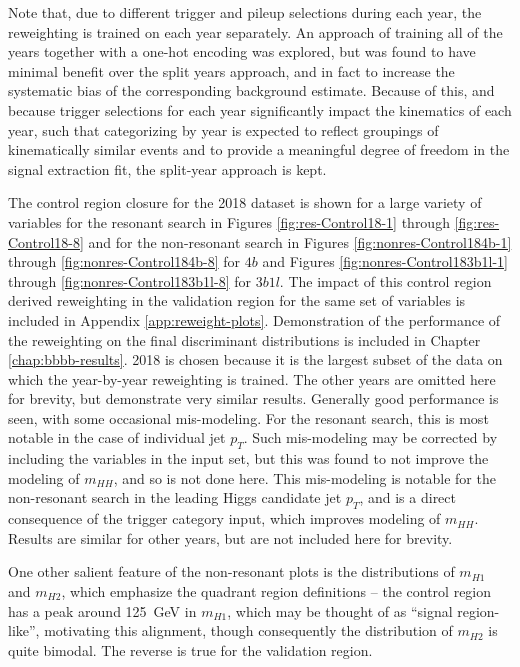 Note that, due to different trigger and pileup selections during each year, 
the reweighting is trained on each year separately. An approach of training all of the years 
together with a one-hot encoding was explored, but was found to have minimal 
benefit over the split years approach, and in fact to increase 
the systematic bias of the corresponding background estimate.
Because of this, and because trigger selections for each year significantly impact the kinematics of each year, 
such that categorizing by year is expected to reflect groupings of kinematically similar events and 
to provide a meaningful degree of freedom in the signal extraction fit, the split-year approach is
kept.

The control region closure for the 2018 dataset is shown for a large variety of variables for 
the resonant search in Figures \ref{fig:res-Control18-1} 
through \ref{fig:res-Control18-8} and for the non-resonant search in Figures \ref{fig:nonres-Control184b-1} 
through \ref{fig:nonres-Control184b-8} for $4b$ and Figures \ref{fig:nonres-Control183b1l-1} 
through \ref{fig:nonres-Control183b1l-8} for $3b1l$. The impact of this control 
region derived reweighting in the validation region for the same set of variables is included in 
Appendix \ref{app:reweight-plots}. Demonstration of the performance of the reweighting on the 
final discriminant distributions is included in Chapter \ref{chap:bbbb-results}.
2018 is chosen because it is the largest subset of the data on which the year-by-year reweighting 
is trained. The other years are omitted here for brevity, but demonstrate very similar results. Generally 
good performance is seen, with some occasional mis-modeling. For the resonant 
search, this is most notable in the case of individual jet $p_{T}$. Such mis-modeling may be corrected 
by including the variables in the input set, but this was found to not improve the modeling of $m_{HH}$, 
and so is not done here. This mis-modeling is notable for the non-resonant search in the leading Higgs candidate 
jet $p_{T}$, and is a direct consequence of the trigger category input, which improves modeling of $m_{HH}$.
Results are similar for other years, but are not included here for brevity. 

One other salient feature of the non-resonant plots is the distributions of $m_{H1}$ and $m_{H2}$, which 
emphasize the quadrant region definitions -- the control region has a peak around \SI{125}{\GeV} in $m_{H1}$, 
which may be thought of as ``signal region-like'', motivating this alignment, though consequently the 
distribution of $m_{H2}$ is quite bimodal. The reverse is true for the validation region.



